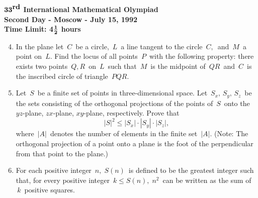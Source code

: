 \begin{center}
${\bf 33}^{\mbox{\bf rd}}$
{\bf International Mathematical Olympiad} \\[.1in]
{\bf Second Day - Moscow - July 15, 1992} \\
{\bf Time Limit: 4}${{\bf 1}\over{\bf 2}}$ {\bf 
hours} 
\end{center}
\begin{enumerate}
\setcounter{enumi}{3}
\item
In the plane let $\, C \,$ be a circle, $\, L \,$ a line tangent
to the circle $\, C, \,$ and $\, M \,$ a point on $\, L$.
Find the locus of all points $\, P \,$ with the following 
property: there exists two points $\, Q, R \,$ on $\, L \,$
such that $\, M \,$ is the midpoint of $\, QR \,$ and $\, C \,$
is the inscribed circle of triangle $\, PQR$.
\item
Let $\, S \,$ be a finite set of points in three-dimensional
space. Let $\, S_x, \, S_y, \, S_z \,$ be the sets consisting of
the orthogonal projections of the points of $\, S \,$ onto the
$yz$-plane, $zx$-plane, $xy$-plane, respectively.  Prove that
\[
|S|^2 \leq |S_x| \cdot |S_y| \cdot |S_z|,
\]
where $\, |A| \,$ denotes the number of elements in the finite
set $\, |A|$.  (Note: The orthogonal projection of a point onto
a plane is the foot of the perpendicular from that point to
the plane.)
\item
For each positive integer $\, n, \; S(n) \,$ is defined to be
the greatest integer such that, for every positive integer
$\, k \leq S(n), \; n^2\,$ can be written as the sum of $\, k \,$
positive squares.
\end{enumerate}

